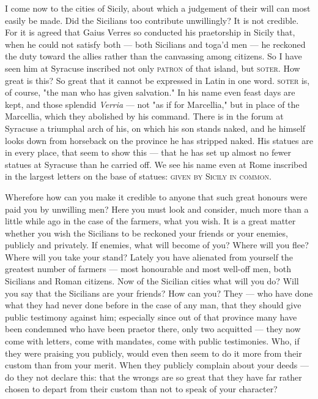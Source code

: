  I come now to the cities of Sicily, about which a judgement of their will can most easily be made. Did the Sicilians too contribute unwillingly? It is not credible. For it is agreed that Gaius Verres so conducted his praetorship in Sicily that, when he could not satisfy both --- both Sicilians and toga'd men --- he reckoned the duty toward the allies rather than the canvassing among citizens. So I have seen him at Syracuse inscribed not only \textsc{patron} of that island, but \textsc{soter}. How great is this? So great that it cannot be expressed in Latin in one word. \textsc{soter} is, of course, "the man who has given salvation." In his name even feast days are kept, and those splendid \textit{Verria} --- not "as if for Marcellia," but in place of the Marcellia, which they abolished by his command. There is in the forum at Syracuse a triumphal arch of his, on which his son stands naked, and he himself looks down from horseback on the province he has stripped naked. His statues are in every place, that seem to show this --- that he has set up almost no fewer statues at Syracuse than he carried off. We see his name even at Rome inscribed in the largest letters on the base of statues: \textsc{given by Sicily in common}.

 Wherefore how can you make it credible to anyone that such great honours were paid you by unwilling men? Here you must look and consider, much more than a little while ago in the case of the farmers, what you wish. It is a great matter whether you wish the Sicilians to be reckoned your friends or your enemies, publicly and privately. If enemies, what will become of you? Where will you flee? Where will you take your stand? Lately you have alienated from yourself the greatest number of farmers --- most honourable and most well-off men, both Sicilians and Roman citizens. Now of the Sicilian cities what will you do? Will you say that the Sicilians are your friends? How can you? They --- who have done what they had never done before in the case of any man, that they should give public testimony against him; especially since out of that province many have been condemned who have been praetor there, only two acquitted --- they now come with letters, come with mandates, come with public testimonies. Who, if they were praising you publicly, would even then seem to do it more from their custom than from your merit. When they publicly complain about your deeds --- do they not declare this: that the wrongs are so great that they have far rather chosen to depart from their custom than not to speak of your character?

